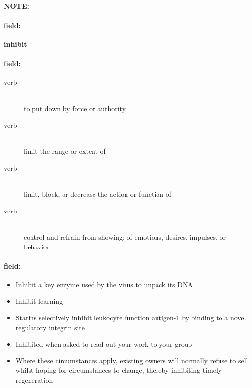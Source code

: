 \documentclass[12pt]{article}
\newenvironment{note}{\paragraph{NOTE:}}{}
\newenvironment{field}{\paragraph{field:}}{}
\begin{document}
\begin{note}
\begin{field}
\textbf{\large inhibit}
\end{field}


\begin{field}
\begin{description}
\item[verb] \hfill \\ 
to put down by force or authority

\item[verb] \hfill \\ 
limit the range or extent of

\item[verb] \hfill \\ 
limit, block, or decrease the action or function of

\item[verb] \hfill \\ 
control and refrain from showing; of emotions, desires, impulses, or behavior

\end{description}
\end{field}

\begin{field}
\begin{itemize}
\item Inhibit a key enzyme used by the virus to unpack its DNA
\item Inhibit learning
\item Statins selectively inhibit leukocyte function antigen-1 by binding to a novel regulatory integrin site
\item Inhibited when asked to read out your work to your group
\item Where these circumstances apply, existing owners will normally refuse to sell whilst hoping for circumstances to change, thereby inhibiting timely regeneration
\end{itemize}
\end{field}
\end{note}
\end{document}
